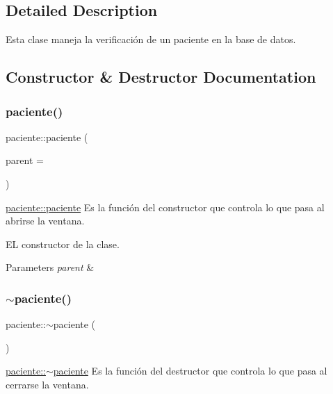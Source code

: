 \subsection{Detailed Description}
Esta clase maneja la verificación de un paciente en la base de datos. 

\subsection{Constructor \& Destructor Documentation}
\mbox{\label{classpaciente_ad0ccef0b1f9db88970e6c748988cdf68}} 
\subsubsection{\texorpdfstring{paciente()}{paciente()}}
{\footnotesize\ttfamily paciente\+::paciente (\begin{DoxyParamCaption}\item[{Q\+Widget $\ast$}]{parent = {} }\end{DoxyParamCaption})\hspace{0.3cm}{\ttfamily [explicit]}}



\hyperlink{classpaciente_ad0ccef0b1f9db88970e6c748988cdf68}{paciente\+::paciente} Es la función del constructor que controla lo que pasa al abrirse la ventana. 

EL constructor de la clase.


\begin{DoxyParams}{Parameters}
{\em parent} & \\
\hline
\end{DoxyParams}
\mbox{\label{classpaciente_aa2c0443ac761e3c01437ec3b051b1e5a}} 
\subsubsection{\texorpdfstring{$\sim$paciente()}{~paciente()}}
{\footnotesize\ttfamily paciente\+::$\sim$paciente (\begin{DoxyParamCaption}{ }\end{DoxyParamCaption})}



\hyperlink{classpaciente_aa2c0443ac761e3c01437ec3b051b1e5a}{paciente\+::$\sim$paciente} Es la función del destructor que controla lo que pasa al cerrarse la ventana. 


